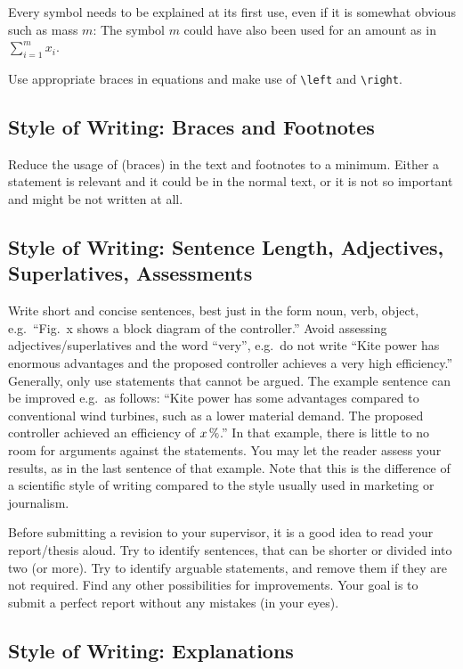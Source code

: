 \documentclass[journal]{IEEEtran}
\begin{document}
Every symbol needs to be explained at its first use, even if it is somewhat obvious such as mass $m$: The symbol $m$ could have also been used for an amount as in $\sum_{i=1}^m x_i$.

Use appropriate braces in equations and make use of \texttt{\textbackslash{}left} and \texttt{\textbackslash{}right}.

\subsection{Style of Writing: Braces and Footnotes}

Reduce the usage of (braces) in the text and footnotes to a minimum. Either a statement is relevant and it could be in the normal text, or it is not so important and might be not written at all.

\subsection{Style of Writing: Sentence Length, Adjectives, Superlatives, Assessments}

Write short and concise sentences, best just in the form noun, verb, object, e.g.\ “Fig.~x shows a block diagram of the controller.” Avoid assessing adjectives/superlatives and the word “very”, e.g.\ do not write “Kite power has enormous advantages and the proposed controller achieves a very high efficiency.” Generally, only use statements that cannot be argued. The example sentence can be improved e.g.\ as follows: “Kite power has some advantages compared to conventional wind turbines, such as a lower material demand. The proposed controller achieved an efficiency of $\unit[x]{\%}$.” In that example, there is little to no room for arguments against the statements. You may let the reader assess your results, as in the last sentence of that example. Note that this is the difference of a scientific style of writing compared to the style usually used in marketing or journalism.

Before submitting a revision to your supervisor, it is a good idea to read your report/thesis aloud. Try to identify sentences, that can be shorter or divided into two (or more). Try to identify arguable statements, and remove them if they are not required. Find any other possibilities for improvements. Your goal is to submit a perfect report without any mistakes (in your eyes).

\subsection{Style of Writing: Explanations}
\end{document}
